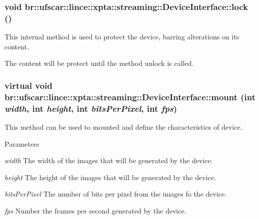 \hypertarget{classbr_1_1ufscar_1_1lince_1_1xpta_1_1streaming_1_1DeviceInterface_ab8de766460c25e220e6a83f163775960}{
\subsubsection[{lock}]{\setlength{\rightskip}{0pt plus 5cm}void br::ufscar::lince::xpta::streaming::DeviceInterface::lock ()}}
\label{classbr_1_1ufscar_1_1lince_1_1xpta_1_1streaming_1_1DeviceInterface_ab8de766460c25e220e6a83f163775960}


This internal method is used to protect the device, barring alterations on its content. 

The content will be protect until the method unlock is called. \hypertarget{classbr_1_1ufscar_1_1lince_1_1xpta_1_1streaming_1_1DeviceInterface_a0fdba459c2b103e4b301702b978248b5}{
\subsubsection[{mount}]{\setlength{\rightskip}{0pt plus 5cm}virtual void br::ufscar::lince::xpta::streaming::DeviceInterface::mount (int {\em width}, \/  int {\em height}, \/  int {\em bitsPerPixel}, \/  int {\em fps})}}
\label{classbr_1_1ufscar_1_1lince_1_1xpta_1_1streaming_1_1DeviceInterface_a0fdba459c2b103e4b301702b978248b5}


This method can be used to mounted and define the characteristics of device. 


\begin{DoxyParams}{Parameters}
\item[{\em width}]The width of the images that will be generated by the device. \item[{\em height}]The height of the images that will be generated by the device. \item[{\em bitsPerPixel}]The number of bits per pixel from the images fo the device. \item[{\em fps}]Number the frames per second generated by the device. \end{DoxyParams}

